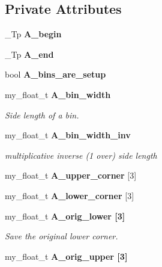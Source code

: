 \subsection*{Private Attributes}
\begin{CompactItemize}
\item 
\_\-Tp \textbf{A\_\-begin}\label{classASCbase_1_1point__bins_143c4437ed0bc651257efcfad94675da}

\item 
\_\-Tp \textbf{A\_\-end}\label{classASCbase_1_1point__bins_47b57104346abc683d5ab5158c42369d}

\item 
bool \textbf{A\_\-bins\_\-are\_\-setup}\label{classASCbase_1_1point__bins_7d80fecfcd4518db8d4a32cd093dfd4c}

\item 
my\_\-float\_\-t \bf{A\_\-bin\_\-width}\label{classASCbase_1_1point__bins_6ffd0913f0c0588e3c2ce19d1f4a96e3}

\begin{CompactList}\small\item\em Side length of a bin. \item\end{CompactList}\item 
my\_\-float\_\-t \bf{A\_\-bin\_\-width\_\-inv}\label{classASCbase_1_1point__bins_4fde2008e3f81fb68191c68127c20443}

\begin{CompactList}\small\item\em multiplicative inverse (1 over) side length \item\end{CompactList}\item 
my\_\-float\_\-t \textbf{A\_\-upper\_\-corner} [3]\label{classASCbase_1_1point__bins_313de0207d76bd11771307cf40f14729}

\item 
my\_\-float\_\-t \textbf{A\_\-lower\_\-corner} [3]\label{classASCbase_1_1point__bins_9ee31e608013306e3dd0416bd3813e84}

\item 
my\_\-float\_\-t \bf{A\_\-orig\_\-lower} [3]\label{classASCbase_1_1point__bins_274999e259918f2b0b5d3c2ba58435cb}

\begin{CompactList}\small\item\em Save the original lower corner. \item\end{CompactList}\item 
my\_\-float\_\-t \bf{A\_\-orig\_\-upper} [3]\label{classASCbase_1_1point__bins_6a3cf278675b515ed22a9bdfdf216784}


\end{CompactItemize}
